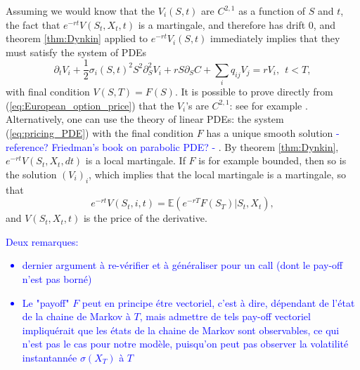 \documentclass[a4paper, 11pt]{amsart}
\newtheorem{definition and theorem}[theorem]{Definition and   
Theorem}
\begin{document}
Assuming we would know that the $V _i (S, t ) $ are $C^{2, 1 } $ as a function of $S $ and $t $, the fact that $e^{-r t } V(S_t, X_t , t ) $ is a martingale, and therefore has drift 0, and theorem \ref{thm:Dynkin} applied to $e^{- r t } V_i (S, t ) $ immediately implies that they must satisfy the system of PDEs
\begin{equation} \label{eq:pricing_PDE}
    \partial _t V_i + \frac{1 }{2 } \sigma _i (S , t )^2 S^2 \partial _S ^2 V_i + r S \partial _S C + \sum _i q_{ij } V_j = r V_i , \ \ t < T ,
\end{equation}
with final condition $V(S, T ) = F(S) . $ It is possible to prove directly from (\ref{eq:European_option_price}) that the $V_i $'s are $C^{2 , 1 } $: see for example \cite{?}. Alternatively, one can use the theory of linear PDEs: the system (\ref{eq:pricing_PDE}) with the final condition $F $  has a unique smooth solution \textcolor{blue}{- reference? Friedman's book on parabolic PDE? - }. By theorem \ref{thm:Dynkin}, $e^{- r t } V(S_t , X_t , dt ) $ is a local martingale. If $F $ is for example bounded, then so is the solution $(V_i )_i $, which implies that the local martingale is a martingale, so that
$$
    e^{-r t } V(S_t , i,  t ) = \mathbb{E } \left( e^{- r T } F(S_T ) | S_t, X_t \right) ,
$$
and $V(S_t, X_t , t ) $ is the price of the derivative.
\medskip

\textcolor{blue}{Deux remarques:
    \begin{itemize}
        \item dernier argument \`a re-v\'erifier et \`a g\'en\'eraliser pour un call (dont le pay-off n'est pas born\'e)
        \item Le "payoff" $F $ peut en principe \'etre vectoriel, c'est \`a dire, d\'ependant de l'\'etat de la chaine de Markov \`a $T $, mais admettre de tels pay-off vectoriel impliqu\'erait que les \'etats de la chaine de Markov sont observables, ce qui n'est pas le cas pour notre mod\`ele, puisqu'on peut pas observer la volatilit\'e instantann\'ee $\sigma (X_T ) $ \`a $T $
    \end{itemize}
}
\medskip
\end{document}
